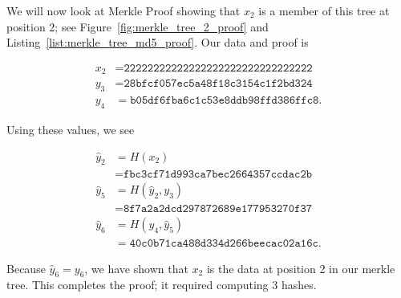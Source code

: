 \begin{example}

We will now look at Merkle Proof showing that $x_{2}$
is a member of this tree at position 2;
see Figure~\ref{fig:merkle_tree_2_proof}
and Listing~\ref{list:merkle_tree_md5_proof}.
Our data and proof is



\begin{align}
    x_{2} &= \texttt{22222222222222222222222222222222}
        \nonumber\\
    y_{3} &= \texttt{28bfcf057ec5a48f18c3154c1f2bd324}
        \nonumber\\
    y_{4} &= \texttt{b05df6fba6c1c53e8ddb98ffd386ffc8}.
\end{align}

\noindent
Using these values, we see

\begin{align}
    \hat{y}_{2} &= H(x_{2}) \nonumber\\
        &= \texttt{fbc3cf71d993ca7bec2664357ccdac2b}
            \nonumber\\
    \hat{y}_{5} &= H(\hat{y}_{2}, y_{3}) \nonumber\\
        &= \texttt{8f7a2a2dcd297872689e177953270f37}
            \nonumber\\
    \hat{y}_{6} &= H(y_{4}, \hat{y}_{5}) \nonumber\\
        &= \texttt{40c0b71ca488d334d266beecac02a16c}.
\end{align}

\noindent
Because $\hat{y}_{6} = y_{6}$, we have shown that $x_{2}$ is the data
at position 2 in our \gls{merkle tree}.
This completes the proof;
it required computing 3 hashes.
\end{example}

